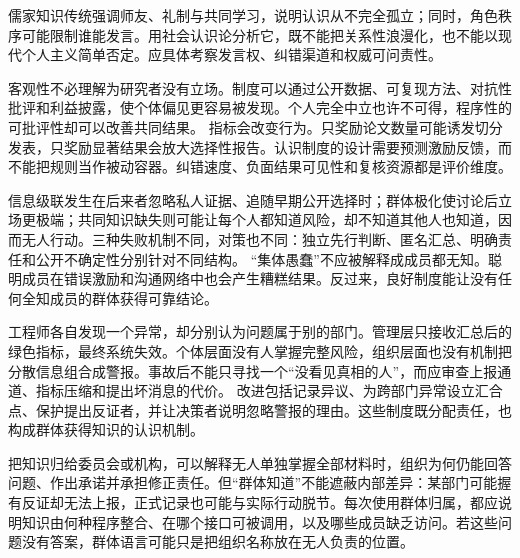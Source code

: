 \begin{comparison}
儒家知识传统强调师友、礼制与共同学习，说明认识从不完全孤立；同时，角色秩序可能限制谁能发言。用社会认识论分析它，既不能把关系性浪漫化，也不能以现代个人主义简单否定。应具体考察发言权、纠错渠道和权威可问责性。
\end{comparison}

客观性不必理解为研究者没有立场。制度可以通过公开数据、可复现方法、对抗性批评和利益披露，使个体偏见更容易被发现\parencite{longino1990}。个人完全中立也许不可得，程序性的可批评性却可以改善共同结果。 指标会改变行为。只奖励论文数量可能诱发切分发表，只奖励显著结果会放大选择性报告。认识制度的设计需要预测激励反馈，而不能把规则当作被动容器。纠错速度、负面结果可见性和复核资源都是评价维度。

信息级联发生在后来者忽略私人证据、追随早期公开选择时；群体极化使讨论后立场更极端；共同知识缺失则可能让每个人都知道风险，却不知道其他人也知道，因而无人行动。三种失败机制不同，对策也不同：独立先行判断、匿名汇总、明确责任和公开不确定性分别针对不同结构。 “集体愚蠢”不应被解释成成员都无知。聪明成员在错误激励和沟通网络中也会产生糟糕结果。反过来，良好制度能让没有任何全知成员的群体获得可靠结论。

工程师各自发现一个异常，却分别认为问题属于别的部门。管理层只接收汇总后的绿色指标，最终系统失效。个体层面没有人掌握完整风险，组织层面也没有机制把分散信息组合成警报。事故后不能只寻找一个“没看见真相的人”，而应审查上报通道、指标压缩和提出坏消息的代价。 改进包括记录异议、为跨部门异常设立汇合点、保护提出反证者，并让决策者说明忽略警报的理由。这些制度既分配责任，也构成群体获得知识的认识机制。

把知识归给委员会或机构，可以解释无人单独掌握全部材料时，组织为何仍能回答问题、作出承诺并承担修正责任。但“群体知道”不能遮蔽内部差异：某部门可能握有反证却无法上报，正式记录也可能与实际行动脱节。每次使用群体归属，都应说明知识由何种程序整合、在哪个接口可被调用，以及哪些成员缺乏访问。若这些问题没有答案，群体语言可能只是把组织名称放在无人负责的位置。
